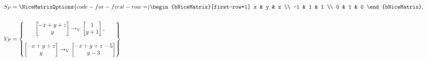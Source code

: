 \begin{align*}
S_P &= 
\NiceMatrixOptions{code-for-first-row=\scriptstyle}
	\begin{bNiceMatrix}[first-row=1]
		x & y & z \\
		-1 & 1 & 1 \\
		0 & 1 & 0
	\end{bNiceMatrix}, \ \\ \\
    V_P &= \begin{Bmatrix}
              \begin{bmatrix}
                    - x + y + z \\
                    y
               \end{bmatrix} \rightarrow_V
               \begin{bmatrix}
                     1 \\
                     y + 1
               \end{bmatrix}, \\ \\
               \begin{bmatrix}
                     - x + y + z \\
                    y
               \end{bmatrix} \rightarrow_V
               \begin{bmatrix}
                    - x + y + z - 5 \\
                    y - 3
              \end{bmatrix}
    \end{Bmatrix}
\end{align*}
